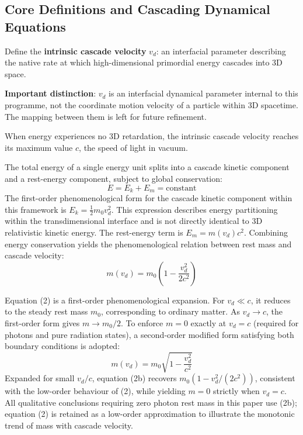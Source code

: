 \documentclass[12pt,a4paper]{article}
\begin{document}
\subsection{Core Definitions and Cascading Dynamical Equations}
Define the \textbf{intrinsic cascade velocity} $v_d$: an interfacial parameter describing the native rate at which high-dimensional primordial energy cascades into 3D space.

\textbf{Important distinction}: $v_d$ is an interfacial dynamical parameter internal to this programme, not the coordinate motion velocity of a particle within 3D spacetime. The mapping between them is left for future refinement.

When energy experiences no 3D retardation, the intrinsic cascade velocity reaches its maximum value $c$, the speed of light in vacuum.

The total energy of a single energy unit splits into a cascade kinetic component and a rest-energy component, subject to global conservation:
\begin{equation}
E = E_k + E_m = \text{constant}
\end{equation}
The first-order phenomenological form for the cascade kinetic component within this framework is $E_k = \frac{1}{2} m_0 v_d^2$. This expression describes energy partitioning within the transdimensional interface and is not directly identical to 3D relativistic kinetic energy. The rest-energy term is $E_m = m(v_d) c^2$. Combining energy conservation yields the phenomenological relation between rest mass and cascade velocity:
\begin{equation}
m(v_d) = m_0 \left( 1 - \frac{v_d^2}{2c^2} \right)
\end{equation}

Equation (2) is a first-order phenomenological expansion. For $v_d \ll c$, it reduces to the steady rest mass $m_0$, corresponding to ordinary matter. As $v_d \to c$, the first-order form gives $m \to m_0/2$. To enforce $m=0$ exactly at $v_d=c$ (required for photons and pure radiation states), a second-order modified form satisfying both boundary conditions is adopted:
\begin{equation*}
m(v_d) = m_0 \sqrt{1 - \frac{v_d^2}{c^2}} \tag{2b}
\end{equation*}
Expanded for small $v_d/c$, equation (2b) recovers $m_0\left(1 - v_d^2/(2c^2)\right)$, consistent with the low-order behaviour of (2), while yielding $m=0$ strictly when $v_d=c$. All qualitative conclusions requiring zero photon rest mass in this paper use (2b); equation (2) is retained as a low-order approximation to illustrate the monotonic trend of mass with cascade velocity.
\end{document}
